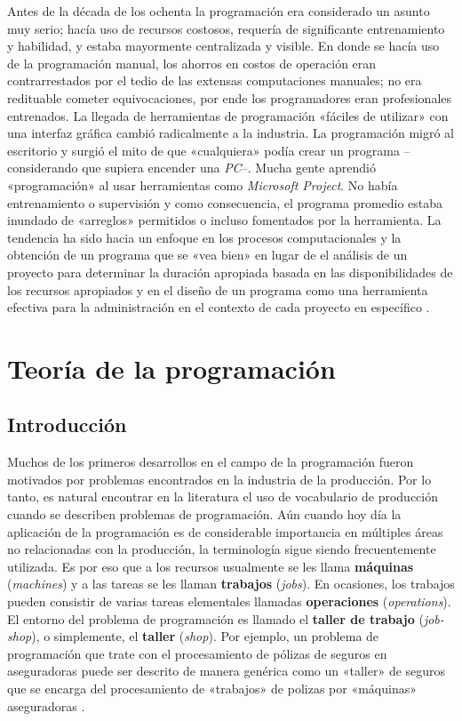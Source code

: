 \documentclass[spanish,draft,12pt,headsepline,footsepline,paper=letter]{scrreprt}
\begin{document}
Antes de la década de los ochenta la programación era considerado un asunto muy serio; hacía uso de recursos costosos, requería de significante entrenamiento y habilidad, y estaba mayormente centralizada y visible. En donde se hacía uso de la programación manual, los ahorros en costos de operación eran contrarrestados por el tedio de las extensas computaciones manuales; no era redituable cometer equivocaciones, por ende los programadores eran profesionales entrenados.
%
La llegada de herramientas de programación «fáciles de utilizar» con una interfaz gráfica cambió radicalmente a la industria. La programación migró al escritorio y surgió el mito de que «cualquiera» podía crear un programa –considerando que supiera encender una \textit{PC}–. Mucha gente aprendió «programación» al usar herramientas como \textit{Microsoft Project}. No había entrenamiento o supervisión y como consecuencia, el programa promedio estaba inundado de «arreglos» permitidos o incluso fomentados por la herramienta. La tendencia ha sido hacia un enfoque en los procesos computacionales y la obtención de un programa que se «vea bien» en lugar de el análisis de un proyecto para determinar la duración apropiada basada en las disponibilidades de los recursos apropiados y en el diseño de un programa como una herramienta efectiva para la administración en el contexto de cada proyecto en específico \citep[p.~12,~13]{Weaver2006}.

\chapter{Teoría de la programación}
\label{teoria_programacion}

\section{Introducción}

Muchos de los primeros desarrollos en el campo de la programación fueron motivados por problemas encontrados en la industria de la producción. Por lo tanto, es natural encontrar en la literatura el uso de vocabulario de producción cuando se describen problemas de programación. Aún cuando hoy día la aplicación de la programación es de considerable importancia en múltiples áreas no relacionadas con la producción, la terminología sigue siendo frecuentemente utilizada. Es por eso que a los recursos usualmente se les llama \textbf{máquinas} (\textit{machines}) y a las tareas se les llaman \textbf{trabajos} (\textit{jobs}). En ocasiones, los trabajos pueden consistir de varias tareas elementales llamadas \textbf{operaciones} (\textit{operations}). El entorno del problema de programación es llamado el \textbf{taller de trabajo} (\textit{job-shop}), o simplemente, el \textbf{taller} (\textit{shop}). Por ejemplo, un problema de programación que trate con el procesamiento de pólizas de seguros en aseguradoras puede ser descrito de manera genérica como un «taller» de seguros que se encarga del procesamiento de «trabajos» de polizas por «máquinas» aseguradoras \citep[p.~3]{Baker2009}.
\end{document}
